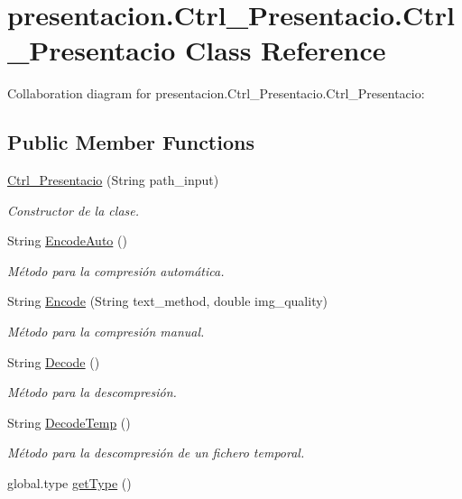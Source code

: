 \hypertarget{classpresentacion_1_1Ctrl__Presentacio_1_1Ctrl__Presentacio}{}\section{presentacion.\+Ctrl\+\_\+\+Presentacio.\+Ctrl\+\_\+\+Presentacio Class Reference}
\label{classpresentacion_1_1Ctrl__Presentacio_1_1Ctrl__Presentacio}


Collaboration diagram for presentacion.\+Ctrl\+\_\+\+Presentacio.\+Ctrl\+\_\+\+Presentacio\+:
\subsection*{Public Member Functions}
\begin{DoxyCompactItemize}
\item 
\hyperlink{classpresentacion_1_1Ctrl__Presentacio_1_1Ctrl__Presentacio_a3d3ac2a3c4b9fa715bb631fdf3a955dd}{Ctrl\+\_\+\+Presentacio} (String path\+\_\+input)
\begin{DoxyCompactList}\small\item\em Constructor de la clase. \end{DoxyCompactList}\item 
String \hyperlink{classpresentacion_1_1Ctrl__Presentacio_1_1Ctrl__Presentacio_a3c70338349a2890f5191162b22ee78dc}{Encode\+Auto} ()
\begin{DoxyCompactList}\small\item\em Método para la compresión automática. \end{DoxyCompactList}\item 
String \hyperlink{classpresentacion_1_1Ctrl__Presentacio_1_1Ctrl__Presentacio_a83ea715afbbe389c6f1fb68f29121205}{Encode} (String text\+\_\+method, double img\+\_\+quality)
\begin{DoxyCompactList}\small\item\em Método para la compresión manual. \end{DoxyCompactList}\item 
String \hyperlink{classpresentacion_1_1Ctrl__Presentacio_1_1Ctrl__Presentacio_adc652f63ed7619207a94a3a58b6bdd77}{Decode} ()
\begin{DoxyCompactList}\small\item\em Método para la descompresión. \end{DoxyCompactList}\item 
String \hyperlink{classpresentacion_1_1Ctrl__Presentacio_1_1Ctrl__Presentacio_aa9c12bc59a7e9fa0ccd09c0e007d4a4c}{Decode\+Temp} ()
\begin{DoxyCompactList}\small\item\em Método para la descompresión de un fichero temporal. \end{DoxyCompactList}\item 
global.\+type \hyperlink{classpresentacion_1_1Ctrl__Presentacio_1_1Ctrl__Presentacio_a029db5d77bf1e81be0811816a74d81a0}{get\+Type} ()
\end{DoxyCompactItemize}
